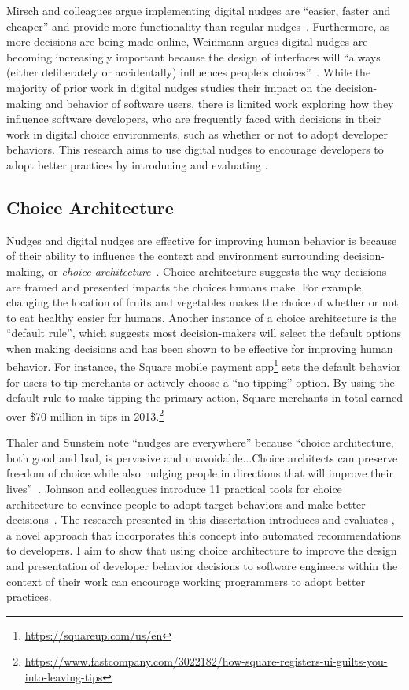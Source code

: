 Mirsch and colleagues argue implementing digital nudges are ``easier, faster and cheaper'' and provide more functionality than regular nudges~\citep[p.~635]{mirsch2017digital}. Furthermore, as more decisions are being made online, Weinmann argues digital nudges are becoming increasingly important because the design of interfaces will ``always (either deliberately or accidentally) influences people's choices''~\citep[p.~433]{weinmann2016digitalnudging}. 
While the majority of prior work in digital nudges studies their impact on the decision-making and behavior of software users, there is limited work exploring how they influence software developers, who are frequently faced with decisions in their work in digital choice environments, such as whether or not to adopt developer behaviors. This research aims to use digital nudges to encourage developers to adopt better practices by introducing and evaluating \framework.

\subsection{Choice Architecture}
\label{back-choice}

Nudges and digital nudges are effective for improving human behavior is because of their ability to influence the context and environment surrounding decision-making, or \textit{choice architecture}~\cite{thaler2013choice}. Choice architecture suggests the way decisions are framed and presented impacts the choices humans make. For example, changing the location of fruits and vegetables makes the choice of whether or not to eat healthy easier for humans. Another instance of a choice architecture is the ``default rule'', which suggests most decision-makers will select the default options when making decisions and has been shown to be effective for improving human behavior. For instance, the Square mobile payment app\footnote{\url{https://squareup.com/us/en}} sets the default behavior for users to tip merchants or actively choose a ``no tipping'' option. By using the default rule to make tipping the primary action, Square merchants in total earned over \$70 million in tips in 2013.\footnote{\url{https://www.fastcompany.com/3022182/how-square-registers-ui-guilts-you-into-leaving-tips}} 

Thaler and Sunstein note ``nudges are everywhere'' because ``choice architecture, both good and bad, is pervasive and unavoidable...Choice architects can preserve freedom of choice while also nudging people in directions that will improve their lives''~\citep[p.~255]{nudge}. Johnson and colleagues introduce 11 practical tools for choice architecture to convince people to adopt target behaviors and make better decisions~\cite{johnson2012beyond}. The research presented in this dissertation introduces and evaluates \framework, a novel approach that incorporates this concept into automated recommendations to developers. I aim to show that using choice architecture to improve the design and presentation of developer behavior decisions to software engineers within the context of their work can encourage working programmers to adopt better practices.

